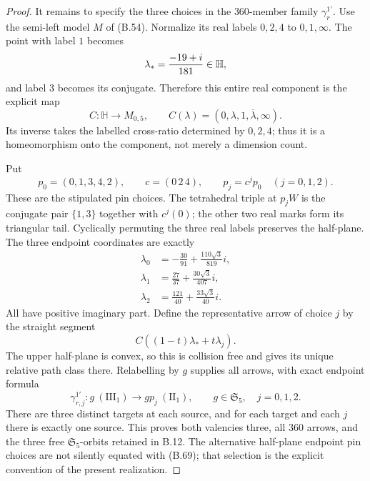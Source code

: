 \begin{proof}
It remains to specify the three choices in the
$360$-member family $\gamma_r^{1'}$.  Use the semi-left
model $M$ of (B.54).  Normalize its real labels $0,2,4$
to $0,1,\infty$.  The point with label $1$ becomes
\[
 \lambda_*={-19+i\over181}\in\mathbb H,
\]
and label $3$ becomes its conjugate.  Therefore this
entire real component is the explicit map
\[
 C:\mathbb H\longrightarrow M_{0,5},\qquad
 C(\lambda)=(0,\lambda,1,\overline\lambda,\infty).
                                                               \tag{B.68}
\]
Its inverse takes the labelled cross-ratio determined by
$0,2,4$; thus it is a homeomorphism onto the component,
not merely a dimension count.

Put
\[
 p_0=(0,1,3,4,2),\qquad c=(0\,2\,4),\qquad
 p_j=c^jp_0\quad(j=0,1,2).                         \tag{B.69}
\]
These are the stipulated pin choices.  The tetrahedral
triple at $p_jW$ is the conjugate pair $\{1,3\}$ together
with $c^j(0)$; the other two real marks form its triangular
tail.  Cyclically permuting the three real labels preserves
the half-plane.  The three endpoint coordinates are exactly
\[
\begin{aligned}
 \lambda_0&=-\frac{30}{91}+\frac{110\sqrt3}{819}i,\\
 \lambda_1&=\frac{27}{37}+\frac{30\sqrt3}{407}i,\\
 \lambda_2&=\frac{121}{40}+\frac{33\sqrt3}{40}i.
\end{aligned}                                                     \tag{B.70}
\]
All have positive imaginary part.  Define the representative
arrow of choice $j$ by the straight segment
\[
 C((1-t)\lambda_*+t\lambda_j).                    \tag{B.71}
\]
The upper half-plane is convex, so this is collision free
and gives its unique relative path class there.  Relabelling
by $g$ supplies all arrows, with exact endpoint formula
\[
 \gamma_{r,j}^{1'}:g\ (\mathrm{III}_1)\longrightarrow
                      gp_j\ (\mathrm{II}_1),
 \qquad g\in\mathfrak S_5,\quad j=0,1,2.            \tag{B.72}
\]
There are three distinct targets at each source, and for
each target and each $j$ there is exactly one source.
This proves both valencies three, all $360$ arrows, and
the three free $\mathfrak S_5$-orbits retained in B.12.
The alternative half-plane endpoint pin choices are
not silently equated with (B.69); that selection is the
explicit convention of the present realization.


\end{proof}
